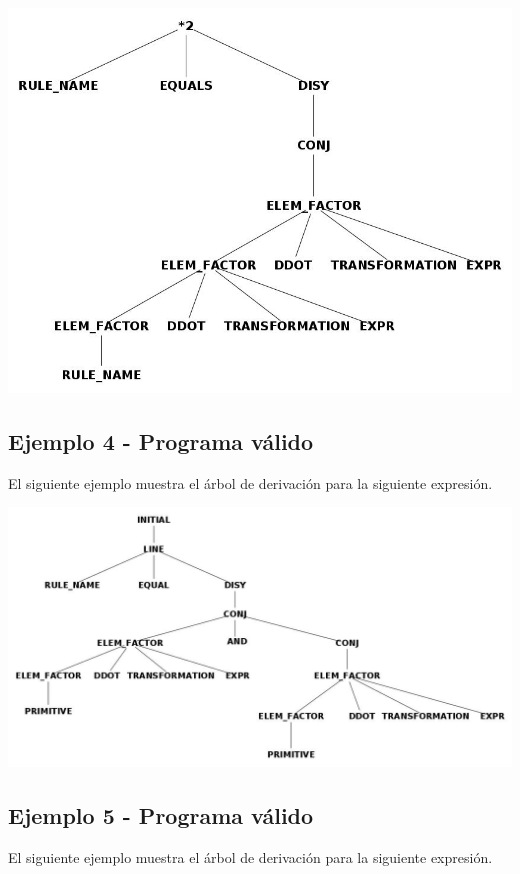 \centerline{\includegraphics[scale=0.40]{arboles_derivacion/cube2.jpg}}



\subsection{Ejemplo 4 - Programa v\'alido}
El siguiente ejemplo muestra el \'arbol de derivaci\'on para la siguiente expresi\'on.



\centerline{\includegraphics[scale=0.40]{arboles_derivacion/Ejemplo_and1.jpg}}

\subsection{Ejemplo 5 - Programa v\'alido}

El siguiente ejemplo muestra el \'arbol de derivaci\'on para la siguiente expresi\'on.

